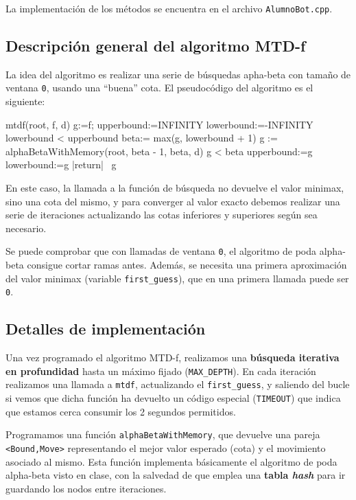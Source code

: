 \documentclass[11pt,a4paper]{article}
\begin{document}
La implementación de los métodos se encuentra en el archivo \verb|AlumnoBot.cpp|.

\subsection*{Descripción general del algoritmo MTD-f}

La idea del algoritmo es realizar una serie de búsquedas apha-beta con tamaño de ventana \verb|0|, usando una ``buena'' cota. El pseudocódigo del algoritmo es el siguiente:

\vspace{-2em}
\begin{program}
\FUNCT mtdf(root, f, d)
g:=f;
upperbound:=INFINITY
lowerbound:=-INFINITY
\WHILE lowerbound < upperbound \DO
beta:= max(g, lowerbound + 1)
g := alphaBetaWithMemory(root, beta - 1, beta, d)
    \IF g < beta 
    \THEN upperbound:=g
\ELSE lowerbound:=g 
\FI
\OD
|return| \ g
\end{program}

En este caso, la llamada a la función de búsqueda no devuelve el valor minimax, sino una cota del mismo, y para converger al valor exacto debemos realizar una serie de iteraciones actualizando las cotas inferiores y superiores según sea necesario.

Se puede comprobar que con llamadas de ventana \verb|0|, el algoritmo de poda alpha-beta consigue cortar ramas antes. Además, se necesita una primera aproximación del valor minimax (variable \verb|first_guess|), que en una primera llamada puede ser \verb|0|.

\subsection*{Detalles de implementación}

Una vez programado el algoritmo MTD-f, realizamos una \textbf{búsqueda iterativa en profundidad} hasta un máximo fijado (\verb|MAX_DEPTH|). En cada iteración realizamos una llamada a \verb|mtdf|, actualizando el \verb|first_guess|, y saliendo del bucle si vemos que dicha función ha devuelto un código especial (\verb|TIMEOUT|) que indica que estamos cerca consumir los 2 segundos permitidos.

Programamos una función  \verb|alphaBetaWithMemory|, que devuelve una pareja \verb|<Bound,Move>| representando el mejor valor esperado (cota) y el movimiento asociado al mismo. Esta función implementa básicamente el algoritmo de poda alpha-beta visto en clase, con la salvedad de que emplea una \textbf{tabla \textit{hash}} para ir guardando los nodos entre iteraciones. 
\end{document}
